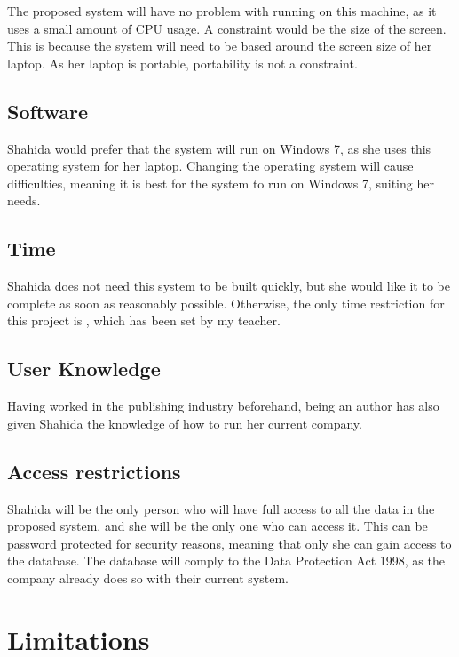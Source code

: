 The proposed system will have no problem with running on this machine, as it uses a small amount of CPU usage. A constraint would be the size of the screen. This is because the system will need to be based around the screen size of her laptop. As her laptop is portable, portability is not a constraint.

\subsection{Software}

Shahida would prefer that the system will run on Windows 7, as she uses this operating system for her laptop. Changing the operating system will cause difficulties, meaning it is best for the system to run on Windows 7, suiting her needs.

\subsection{Time}

Shahida does not need this system to be built quickly, but she would like it to be complete as soon as reasonably possible. Otherwise, the only time restriction for this project is , which has been set by my teacher.

\subsection{User Knowledge}

Having worked in the publishing industry beforehand, being an author has also given Shahida the knowledge of how to run her current company. 

\subsection{Access restrictions}

Shahida will be the only person who will have full access to all the data in the proposed system, and she will be the only one who can access it. This can be password protected for security reasons, meaning that only she can gain access to the database. The database will comply to the Data Protection Act 1998, as the company already does so with their current system.

\section{Limitations}

